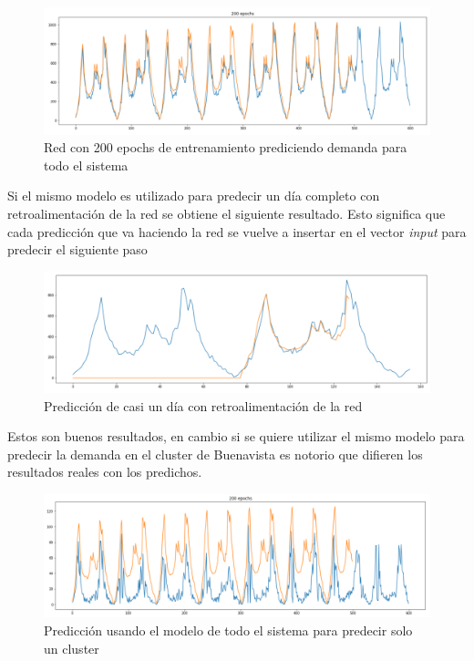 \documentclass[12pt,spanish]{article}
\begin{document}
	\begin{figure}[H]
		\centering
		\includegraphics[width=15cm]{Imagenes/full_200_epochs.PNG}
		\begin{centering}
			\caption{Red con 200 epochs de entrenamiento prediciendo demanda para todo el sistema}
		\end{centering}
	\end{figure}
	Si el mismo modelo es utilizado para predecir un día completo con retroalimentación de la red se obtiene el siguiente resultado. Esto significa que cada predicción que va haciendo la red se vuelve a insertar en el vector \textit{input} para predecir el siguiente paso
	\begin{figure}[H]
		\centering
		\includegraphics[width=15cm]{Imagenes/model_predict_1_day.PNG}
		\begin{centering}
			\caption{Predicción de casi un día con retroalimentación de la red}
		\end{centering}
	\end{figure}
	Estos son buenos resultados, en cambio si se quiere utilizar el mismo modelo para predecir la demanda en el cluster de Buenavista es notorio que difieren los resultados reales con los predichos.
	\begin{figure}[H]
		\centering
		\includegraphics[width=15cm]{Imagenes/model_predict_buenavista_cluster.PNG}
		\begin{centering}
			\caption{Predicción usando el modelo de todo el sistema para predecir solo un cluster}
		\end{centering}
	\end{figure}
\end{document}
